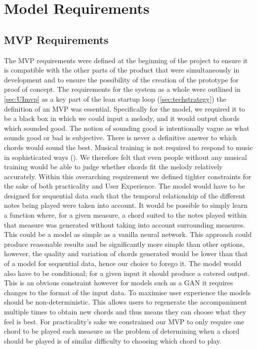 \section{Model Requirements}
\label{sec:Evaluation}
\subsection{MVP Requirements}
\label{sec:MVPRequirements}
The MVP requirements were defined at the beginning of the project to ensure it is compatible with the other parts of the product that were simultaneously in development and to ensure the possibility of the creation of the prototype for proof of concept. 
The requirements for the system as a whole were outlined in \cref{sec:UImvp} as a key part of the lean startup loop (\cref{sec:techstrategy}) the definition of an MVP was essential.
Specifically for the model, we required it to be a black box in which we could input a melody, and it would output chords which sounded good.
The notion of sounding good is intentionally vague as what sounds good or bad is subjective.
There is never a definitive answer to which chords would sound the best.
Musical training is not required to respond to music in sophisticated ways (\cite{ExperiencedListeners}).
We therefore felt that even people without any musical training would be able to judge whether chords fit the melody relatively accurately.
Within this overarching requirement we defined tighter constraints for the sake of both practicality and User Experience. 
The model would have to be designed for sequential data such that the temporal relationship of the different notes being played were taken into account.
It would be possible to simply learn a function where, for a given measure, a chord suited to the notes played within that measure was generated without taking into account surrounding measures.
This could be a model as simple as a vanilla neural network.
This approach could produce reasonable results and be significantly more simple than other options, however, the quality and variation of chords generated would be lower than that of a model for sequential data, hence our choice to forego it.
The model would also have to be conditional; for a given input it should produce a catered output. This is an obvious constraint however for models such as a GAN it requires changes to the format of the input data.
To maximise user experience the models should be non-deterministic. This allows users to regenerate the accompaniment multiple times to obtain new chords and thus means they can choose what they feel is best.
For practicality's sake we constrained our MVP to only require one chord to be played each measure as the problem of determining when a chord should be played is of similar difficulty to choosing which chord to play.
